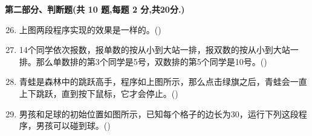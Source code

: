 \documentclass[10pt, a4paper]{article}
\newcommand{\hq}{\hfill(\qquad)}
\begin{document}
    {\noindent\textbf{第二部分、判断题(共 10 题,每题 2 分,共20分.)}}
    \begin{enumerate}
        \setcounter{enumi}{25}
        \item 上图两段程序实现的效果是一样的。\hq

        \item 14个同学依次报数，报单数的按从小到大站一排，报双数的按从小到大站一排。那么单数排的第3个同学是5号，双数排的第5个同学是10号。\hq

        \item 青蛙是森林中的跳跃高手，程序如上图所示，那么点击绿旗之后，青蛙会一直上下跳跃，直到按下鼠标，它才会停止。\hq

        \newpage
        \item 男孩和足球的初始位置如图所示，已知每个格子的边长为30，运行下列这段程序，男孩可以碰到球。\hq


\end{enumerate}
\end{document}
